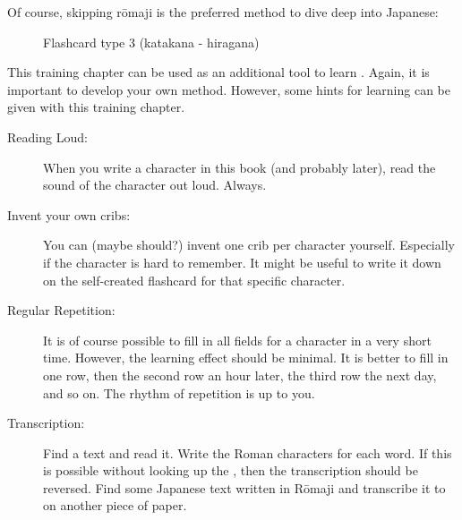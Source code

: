 \normalsize

Of course, skipping rōmaji is the preferred method to dive deep into Japanese:

\begin{figure}[H]
        
        \caption{Flashcard type 3 (katakana - hiragana)}
        \label{fig:FlashCardTypeThree}
\end{figure}

This training chapter can be used as an additional tool to learn
\textbf{\jtopic}. Again, it is important to develop your own method. However,
some hints for learning can be given with this training chapter.

\begin{description}

\item[Reading Loud:] When you write a \textbf{\jtopic} character in this book
        (and probably later), read the sound of the character out loud. Always.

\item[Invent your own cribs:] You can (maybe should?) invent one crib per
        character yourself. Especially if the character is hard to remember. It
        might be useful to write it down on the self-created flashcard for that
        specific character.

\item[Regular Repetition:] It is of course possible to fill in all fields for a
        character in a very short time. However, the learning effect should be
        minimal. It is better to fill in one row, then the second row an hour
        later, the third row the next day, and so on. The rhythm of repetition
        is up to you.

\item[Transcription:] Find a \textbf{\jtopic} text and read it. Write the Roman
        characters for each \jtopic{} word. If this is possible without looking
        up the \jtopic, then the transcription should be reversed. Find some
        Japanese text written in Rōmaji and transcribe it to \jtopic{} on 
        another piece of paper.

\end{description}

\newpage


